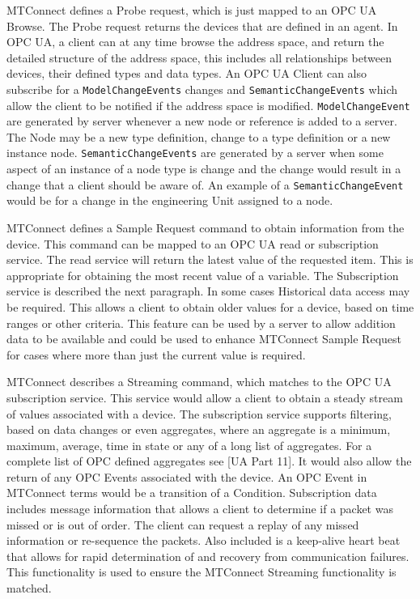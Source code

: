 \documentclass{mtconnect}	%
\begin{document}
MTConnect defines a Probe request, which is just mapped to an OPC UA Browse. The Probe request returns the devices that are defined in an agent. In OPC UA, a client can at any time browse the address space, and return the detailed structure of the address space, this includes all relationships between devices, their defined types and data types. An OPC UA Client can also subscribe for a \texttt{ModelChangeEvents} changes and \texttt{SemanticChangeEvents} which allow the client to be notified if the address space is modified. \texttt{ModelChangeEvent} are generated by server whenever a new node or reference is added to a server. The Node may be a new type definition, change to a type definition or a new instance node. \texttt{SemanticChangeEvents} are generated by a server when some aspect of an instance of a node type is change and the change would result in a change that a client should be aware of. An example of a \texttt{SemanticChangeEvent} would be for a change in the engineering Unit assigned to a node.

MTConnect defines a Sample Request command to obtain information from the device. This command can be mapped to an OPC UA read or subscription service. The read service will return the latest value of the requested item. This is appropriate for obtaining the most recent value of a variable. The Subscription service is described the next paragraph. In some cases Historical data access may be required. This allows a client to obtain older values for a device, based on time ranges or other criteria. This feature can be used by a server to allow addition data to be available and could be used to enhance MTConnect Sample Request for cases where more than just the current value is required.

MTConnect describes a Streaming command, which matches to the OPC UA subscription service. This service would allow a client to obtain a steady stream of values associated with a device. The subscription service supports filtering, based on data changes or even aggregates, where an aggregate is a minimum, maximum, average, time in state or any of a long list of aggregates. For a complete list of OPC defined aggregates see [UA Part 11]. It would also allow the return of any OPC Events associated with the device. An OPC Event in MTConnect terms would be a transition of a Condition. Subscription data includes message information that allows a client to determine if a packet was missed or is out of order. The client can request a replay of any missed information or re-sequence the packets. Also included is a keep-alive heart beat that allows for rapid determination of and recovery from communication failures. This functionality is used to ensure the MTConnect Streaming functionality is matched.
\end{document}
